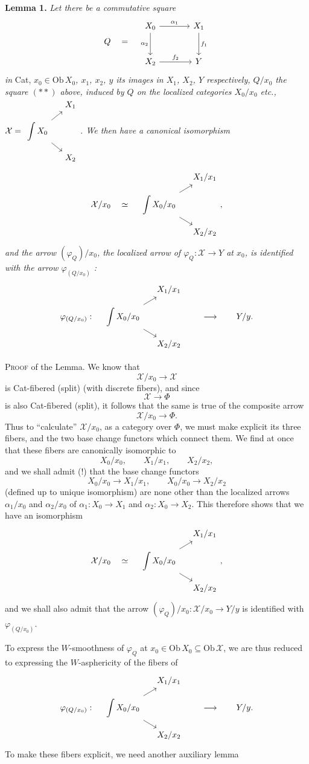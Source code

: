 \documentclass[11pt]{article}
\newcommand{\printedpage}[1]{\marginpar{\footnotesize p.~#1}}
\newcommand{\msp}[1]{\marginpar{\footnotesize [#1]}}
\newcommand{\intdiag}[3]{\begin{tikzcd}[row sep=small,column sep=small,ampersand replacement=\&,baseline=(\tikzcdmatrixname-2-1.base)]
 \& #2 \\
 \displaystyle\int #1 \arrow[ur] \arrow[dr] \& \\
 \& #3
\end{tikzcd}}
\begin{document}
\noindent\textbf{Lemma 1.} \textit{Let there be a commutative square}
\[
Q \quad = \quad
\begin{tikzcd}[row sep=large,column sep=large]
X_0 \arrow[r, "\alpha_1"] \arrow[d, "\alpha_2"'] & X_1 \arrow[d, "f_1"] \\
X_2 \arrow[r, "f_2"] & Y
\end{tikzcd}
\]
\textit{in} Cat, \textit{$x_0\in\mathrm{Ob}\,X_0$, $x_1$, $x_2$, $y$ its images in $X_1$, $X_2$, $Y$ respectively, $Q/x_0$ the square $(**)$ above, induced by $Q$ on the localized categories $X_0/x_0$ etc., $\mathcal{X} = \intdiag{X_0}{X_1}{X_2}$. We then have a}
\printedpage{105}
\msp{page 153}
\textit{canonical isomorphism}
\[
\mathcal{X}/x_0 \quad\simeq\quad \intdiag{X_0/x_0}{X_1/x_1}{X_2/x_2} ,
\]
\textit{and the arrow $(\varphi_Q)/x_0$, the localized arrow of $\varphi_Q : \mathcal{X}\longrightarrow Y$ at $x_0$, is identified with the arrow $\varphi_{(Q/x_0)}$ :}
\[
\varphi_{(Q/x_0)} : \quad \intdiag{X_0/x_0}{X_1/x_1}{X_2/x_2} \qquad\longrightarrow\qquad Y/y.
\]

\noindent\textsc{Proof} of the Lemma. We know that
\[
\mathcal{X}/x_0\longrightarrow\mathcal{X}
\]
is Cat-fibered (split) (with discrete fibers), and since
\[
\mathcal{X}\longrightarrow\Phi
\]
is also Cat-fibered (split), it follows that the same is true of the composite arrow
\[
\mathcal{X}/x_0\longrightarrow\Phi.
\]
Thus to ``calculate'' $\mathcal{X}/x_0$, as a category over $\Phi$, we must make explicit its three fibers, and the two base change functors which connect them. We find at once that these fibers are canonically isomorphic to
\[
X_0/x_0, \qquad X_1/x_1, \qquad X_2/x_2,
\]
and we shall admit (!) that the base change functors
\msp{page 154}
\[
X_0/x_0\longrightarrow X_1/x_1, \qquad X_0/x_0\longrightarrow X_2/x_2
\]
(defined up to unique isomorphism) are none other than the localized arrows $\alpha_1/x_0$ and $\alpha_2/x_0$ of $\alpha_1 : X_0\longrightarrow X_1$ and $\alpha_2 : X_0\longrightarrow X_2$. This therefore shows that we have an isomorphism
\[
\mathcal{X}/x_0 \quad\simeq\quad \intdiag{X_0/x_0}{X_1/x_1}{X_2/x_2} ,
\]
\printedpage{106}
and we shall also admit that the arrow $(\varphi_Q)/x_0 : \mathcal{X}/x_0\longrightarrow Y/y$ is identified with $\varphi_{(Q/x_0)}$.

To express the $W$-smoothness of $\varphi_Q$ at $x_0\in\mathrm{Ob}\,X_0\subseteq\mathrm{Ob}\,\mathcal{X}$, we are thus reduced to expressing the $W$-asphericity of the fibers of
\[
\varphi_{(Q/x_0)} : \quad \intdiag{X_0/x_0}{X_1/x_1}{X_2/x_2} \qquad\longrightarrow\qquad Y/y.
\]
To make these fibers explicit, we need another auxiliary lemma
\end{document}

